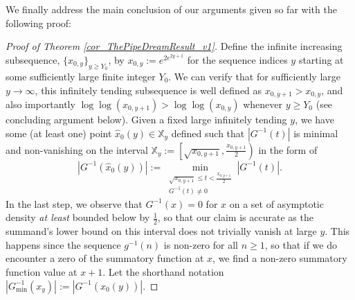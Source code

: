 \documentclass[11pt,reqno,a4letter]{article}
\numberwithin{figure}{section}
\numberwithin{table}{section}
\theoremstyle{plain}
\numberwithin{theorem}{section}
\theoremstyle{definition}
\begin{document}
We finally address the main conclusion of our arguments given so far with the 
following proof: 

\begin{proof}[Proof of Theorem \ref{cor_ThePipeDreamResult_v1}] 
\label{proofOf_cor_ThePipeDreamResult_v1} 
Define the infinite increasing subsequence, 
$\{x_{0,y}\}_{y \geq Y_0}$, by $x_{0,y} := e^{2e^{2y+1}}$ for the sequence indices $y$ 
starting at some sufficiently 
large finite integer $Y_0$. 
We can verify that for sufficiently large $y \rightarrow \infty$, this infinitely 
tending subsequence is well defined as $x_{0,y+1} > x_{0,y}$, and also importantly 
$\log\log(x_{0,y+1}) > \log\log(x_{0,y})$ whenever $y \geq Y_0$ 
(see concluding argument below). 
Given a fixed large infinitely tending $y$, we have some (at least one) point 
$\widehat{x}_0(y) \in\mathbb{X}_y$ defined such that 
$|G^{-1}(t)|$ is minimal and non-vanishing on the interval 
$\mathbb{X}_y := \left[\sqrt{x_{0,y+1}}, \frac{x_{0,y+1}}{2}\right)$ 
in the form of 
\[
\left\lvert G^{-1}(\widehat{x}_0(y)) \right\rvert := 
     \min_{\substack{\sqrt{x_{0,y+1}} \leq t < \frac{x_{0,y+1}}{2} \\ G^{-1}(t) \neq 0}} 
     |G^{-1}(t)|. 
\] 
In the last step, we observe that $G^{-1}(x) = 0$ for $x$ on a set of 
asymptotic density \emph{at least} bounded below by $\frac{1}{2}$, so that our 
claim is accurate as the summand's lower bound on this interval 
does not trivially vanish at large $y$. This happens since the sequence 
$g^{-1}(n)$ is non-zero for all $n \geq 1$, so that if we do encounter a zero of the 
summatory function at $x$, we find a non-zero summatory function value at $x+1$. 
Let the shorthand notation $|G_{\min}^{-1}(x_y)| := |G^{-1}(\hat{x}_0(y))|$. 


\end{proof}
\end{document}
